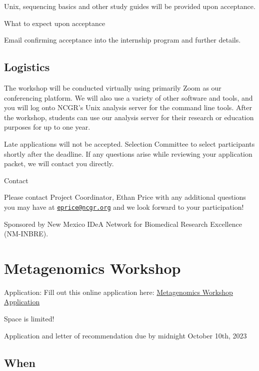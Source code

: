 \documentclass[
]{book}
\begin{document}
Unix, sequencing basics and other study guides will be provided upon acceptance.

What to expect upon acceptance

Email confirming acceptance into the internship program and further details.

\hypertarget{logistics-1}{%
\section*{Logistics}\label{logistics-1}}

The workshop will be conducted virtually using primarily Zoom as our conferencing platform. We will also use a variety of other software and tools, and you will log onto NCGR's Unix analysis server for the command line tools. After the workshop, students can use our analysis server for their research or education purposes for up to one year.

Late applications will not be accepted. Selection Committee to select participants shortly after the deadline. If any questions arise while reviewing your application packet, we will contact you directly.

Contact

Please contact Project Coordinator, Ethan Price with any additional questions you may have at \href{mailto:eprice@ncgr.org}{\nolinkurl{eprice@ncgr.org}} and we look forward to your participation!

Sponsored by New Mexico IDeA Network for Biomedical Research Excellence (NM-INBRE).

\hypertarget{metagenomics-workshop}{%
\chapter*{Metagenomics Workshop}\label{metagenomics-workshop}}

Application: Fill out this online application here: \href{https://sites.google.com/ncgr.org/ncgr-inbre/metagenomics?authuser=0}{Metagenomics Workshop Application}

Space is limited!

Application and letter of recommendation due by midnight October 10th, 2023

\hypertarget{when-3}{%
\section*{When}\label{when-3}}
\end{document}
